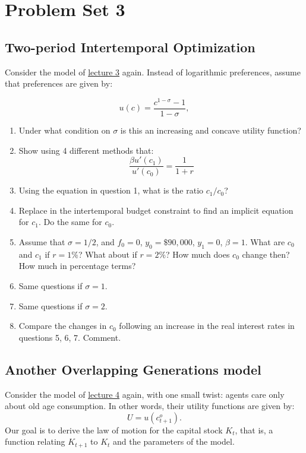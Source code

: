 \documentclass[]{book}
\begin{document}
\hypertarget{pset3}{\chapter{Problem Set 3}\label{pset3}}

\section{Two-period Intertemporal
Optimization}\label{two-period-intertemporal-optimization}

Consider the model of \protect\hyperlink{two-period}{lecture 3} again.
Instead of logarithmic preferences, assume that preferences are given
by:

\[u(c) = \frac{c^{1-\sigma}-1}{1-\sigma},\]

\begin{enumerate}
\def\labelenumi{\arabic{enumi}.}
\item
  Under what condition on \(\sigma\) is this an increasing and concave
  utility function?
\item
  Show using 4 different methods that:
  \[\frac{\beta u'(c_{1})}{u'(c_{0})}=\frac{1}{1+r}\]
\item
  Using the equation in question 1, what is the ratio \(c_1/c_0\)?
\item
  Replace in the intertemporal budget constraint to find an implicit
  equation for \(c_1\). Do the same for \(c_0\).
\item
  Assume that \(\sigma = 1/2\), and \(f_0=0\), \(y_0=\$90,000\),
  \(y_1=0\), \(\beta = 1\). What are \(c_0\) and \(c_1\) if \(r=1\%\)?
  What about if \(r=2\%\)? How much does \(c_0\) change then? How much
  in percentage terms?
\item
  Same questions if \(\sigma = 1\).
\item
  Same questions if \(\sigma = 2\).
\item
  Compare the changes in \(c_0\) following an increase in the real
  interest rates in questions 5, 6, 7. Comment.
\end{enumerate}

\section{Another Overlapping Generations
model}\label{another-overlapping-generations-model}

Consider the model of \protect\hyperlink{olg}{lecture 4} again, with one
small twist: agents care only about old age consumption. In other words,
their utility functions are given by: \[U=u(c_{t+1}^{o}).\] Our goal is
to derive the law of motion for the capital stock \(K_t\), that is, a
function relating \(K_{t+1}\) to \(K_t\) and the parameters of the
model.
\end{document}
